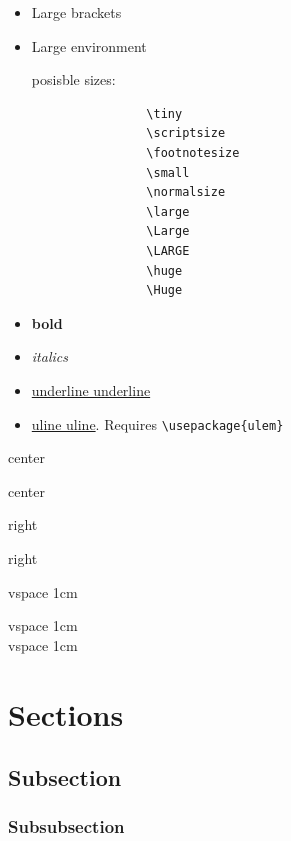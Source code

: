 \documentclass[12pt]{article}
\begin{document}
    \begin{itemize}

        \item {\Large Large brackets}
        \item \begin{Large}Large environment\end{Large}

            posisble sizes:
            \begin{lstlisting}
                \tiny
                \scriptsize
                \footnotesize
                \small
                \normalsize
                \large
                \Large
                \LARGE
                \huge
                \Huge
            \end{lstlisting}
        \item \textbf{bold}
        \item \textit{italics}
        \item \underline{underline underline}
        \item \uline{uline uline}. Requires \lstinline|\usepackage{ulem}|

    \end{itemize}

    \begin{center}
        center

        center
    \end{center}

    \begin{flushright}
        right

        right
    \end{flushright}

    vspace 1cm

    \vspace{1cm}

    vspace 1cm \\[1cm]

    vspace 1cm

\section{Sections}\label{secSec}

    \subsection{Subsection}\label{secSsec}

        \subsubsection{Subsubsection}\label{secSssec}
\end{document}
